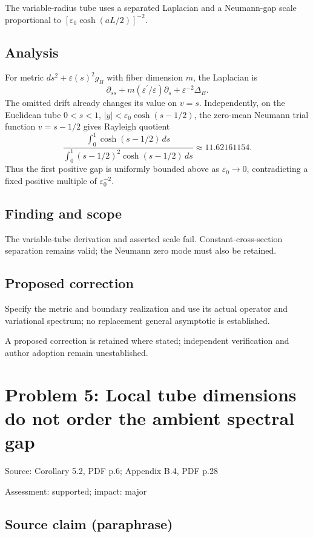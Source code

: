 \documentclass[11pt]{article}
\begin{document}
The variable-radius tube uses a separated Laplacian and a Neumann-gap scale proportional to \([\varepsilon_0\cosh(aL/2)]^{-2}\).

\subsection*{Analysis}

For metric \(ds^2+\varepsilon(s)^2g_B\) with fiber dimension \(m\), the Laplacian is \[\partial_{ss}+m(\varepsilon^{\prime}/\varepsilon)\partial_s+\varepsilon^{-2}\Delta_B.\] The omitted drift already changes its value on \(v=s\). Independently, on the Euclidean tube \(0<s<1\), \(|y|<\varepsilon_0\cosh(s-1/2)\), the zero-mean Neumann trial function \(v=s-1/2\) gives Rayleigh quotient \[\frac{\int_0^1\cosh(s-1/2)\,ds}{\int_0^1(s-1/2)^2\cosh(s-1/2)\,ds}\approx11.62161154.\] Thus the first positive gap is uniformly bounded above as \(\varepsilon_0\to0\), contradicting a fixed positive multiple of \(\varepsilon_0^{-2}\).

\subsection*{Finding and scope}

The variable-tube derivation and asserted scale fail. Constant-cross-section separation remains valid; the Neumann zero mode must also be retained.

\subsection*{Proposed correction}

Specify the metric and boundary realization and use its actual operator and variational spectrum; no replacement general asymptotic is established.

A proposed correction is retained where stated; independent verification and author adoption remain unestablished.

\section*{Problem 5: Local tube dimensions do not order the ambient spectral gap}

Source: Corollary 5.2, PDF p.6; Appendix B.4, PDF p.28

Assessment: supported; impact: major

\subsection*{Source claim (paraphrase)}
\end{document}
